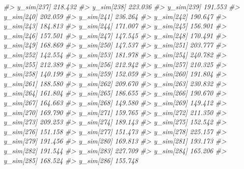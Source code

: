 \documentclass[
  10pt,
  italian,
  a4paper,
  extrafontsizes,onecolumn,openright
  ]{memoir}
\newenvironment{Shaded}{\begin{snugshade}}{\end{snugshade}}
\newcommand{\CommentTok}[1]{\textcolor[rgb]{0.56,0.35,0.01}{\textit{#1}}}
\begin{document}
\begin{Shaded}
\begin{Highlighting}[]
\CommentTok{\#\textgreater{}   y\_sim[237] 218.432}
\CommentTok{\#\textgreater{}   y\_sim[238] 223.036}
\CommentTok{\#\textgreater{}   y\_sim[239] 191.553}
\CommentTok{\#\textgreater{}   y\_sim[240] 202.059}
\CommentTok{\#\textgreater{}   y\_sim[241] 236.264}
\CommentTok{\#\textgreater{}   y\_sim[242] 190.647}
\CommentTok{\#\textgreater{}   y\_sim[243] 184.813}
\CommentTok{\#\textgreater{}   y\_sim[244] 171.007}
\CommentTok{\#\textgreater{}   y\_sim[245] 156.901}
\CommentTok{\#\textgreater{}   y\_sim[246] 157.501}
\CommentTok{\#\textgreater{}   y\_sim[247] 147.545}
\CommentTok{\#\textgreater{}   y\_sim[248] 170.491}
\CommentTok{\#\textgreater{}   y\_sim[249] 168.869}
\CommentTok{\#\textgreater{}   y\_sim[250] 147.537}
\CommentTok{\#\textgreater{}   y\_sim[251] 203.777}
\CommentTok{\#\textgreater{}   y\_sim[252] 142.554}
\CommentTok{\#\textgreater{}   y\_sim[253] 181.978}
\CommentTok{\#\textgreater{}   y\_sim[254] 240.782}
\CommentTok{\#\textgreater{}   y\_sim[255] 212.389}
\CommentTok{\#\textgreater{}   y\_sim[256] 212.942}
\CommentTok{\#\textgreater{}   y\_sim[257] 210.325}
\CommentTok{\#\textgreater{}   y\_sim[258] 140.199}
\CommentTok{\#\textgreater{}   y\_sim[259] 152.059}
\CommentTok{\#\textgreater{}   y\_sim[260] 191.804}
\CommentTok{\#\textgreater{}   y\_sim[261] 188.580}
\CommentTok{\#\textgreater{}   y\_sim[262] 209.670}
\CommentTok{\#\textgreater{}   y\_sim[263] 230.832}
\CommentTok{\#\textgreater{}   y\_sim[264] 161.804}
\CommentTok{\#\textgreater{}   y\_sim[265] 186.655}
\CommentTok{\#\textgreater{}   y\_sim[266] 190.670}
\CommentTok{\#\textgreater{}   y\_sim[267] 164.663}
\CommentTok{\#\textgreater{}   y\_sim[268] 149.580}
\CommentTok{\#\textgreater{}   y\_sim[269] 149.412}
\CommentTok{\#\textgreater{}   y\_sim[270] 169.790}
\CommentTok{\#\textgreater{}   y\_sim[271] 159.765}
\CommentTok{\#\textgreater{}   y\_sim[272] 211.350}
\CommentTok{\#\textgreater{}   y\_sim[273] 209.253}
\CommentTok{\#\textgreater{}   y\_sim[274] 189.143}
\CommentTok{\#\textgreater{}   y\_sim[275] 152.542}
\CommentTok{\#\textgreater{}   y\_sim[276] 151.158}
\CommentTok{\#\textgreater{}   y\_sim[277] 151.473}
\CommentTok{\#\textgreater{}   y\_sim[278] 225.157}
\CommentTok{\#\textgreater{}   y\_sim[279] 191.456}
\CommentTok{\#\textgreater{}   y\_sim[280] 169.813}
\CommentTok{\#\textgreater{}   y\_sim[281] 193.173}
\CommentTok{\#\textgreater{}   y\_sim[282] 191.544}
\CommentTok{\#\textgreater{}   y\_sim[283] 227.709}
\CommentTok{\#\textgreater{}   y\_sim[284] 165.206}
\CommentTok{\#\textgreater{}   y\_sim[285] 168.524}
\CommentTok{\#\textgreater{}   y\_sim[286] 155.748}

\end{Highlighting}
\end{Shaded}
\end{document}
